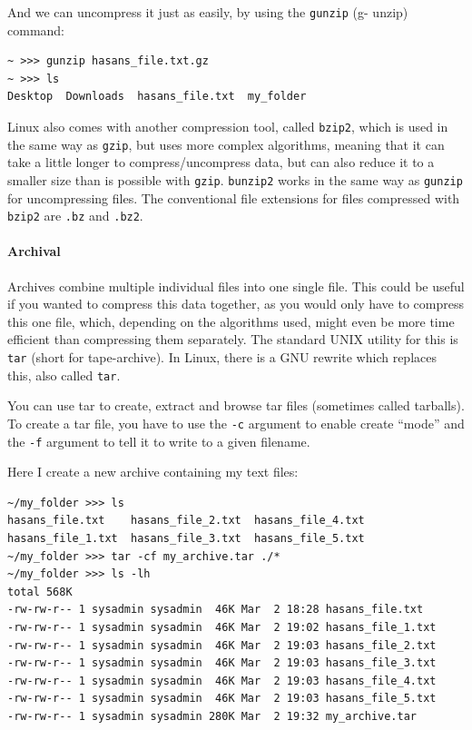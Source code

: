 And we can uncompress it just as easily, by using the \texttt{gunzip} (g- unzip) command:

\begin{verbatim}
~ >>> gunzip hasans_file.txt.gz
~ >>> ls
Desktop  Downloads  hasans_file.txt  my_folder
\end{verbatim}

Linux also comes with another compression tool, called \texttt{bzip2}, which is used in the same way as \texttt{gzip}, but uses more complex algorithms, meaning that it can take a little longer to compress/uncompress data, but can also reduce it to a smaller size than is possible with \texttt{gzip}. \texttt{bunzip2} works in the same way as \texttt{gunzip} for uncompressing files. The conventional file extensions for files compressed with \texttt{bzip2} are \texttt{.bz} and \texttt{.bz2}.

\hypertarget{archival}{%
\paragraph{Archival}\label{archival}}

Archives combine multiple individual files into one single file. This could be useful if you wanted to compress this data together, as you would only have to compress this one file, which, depending on the algorithms used, might even be more time efficient than compressing them separately. The standard UNIX utility for this is \texttt{tar} (short for tape-archive). In Linux, there is a GNU rewrite which replaces this, also called \texttt{tar}.

You can use tar to create, extract and browse tar files (sometimes called tarballs). To create a tar file, you have to use the \texttt{-c} argument to enable create ``mode'' and the \texttt{-f} argument to tell it to write to a given filename.

Here I create a new archive containing my text files:

\begin{verbatim}
~/my_folder >>> ls
hasans_file.txt    hasans_file_2.txt  hasans_file_4.txt
hasans_file_1.txt  hasans_file_3.txt  hasans_file_5.txt
~/my_folder >>> tar -cf my_archive.tar ./*
~/my_folder >>> ls -lh
total 568K
-rw-rw-r-- 1 sysadmin sysadmin  46K Mar  2 18:28 hasans_file.txt
-rw-rw-r-- 1 sysadmin sysadmin  46K Mar  2 19:02 hasans_file_1.txt
-rw-rw-r-- 1 sysadmin sysadmin  46K Mar  2 19:03 hasans_file_2.txt
-rw-rw-r-- 1 sysadmin sysadmin  46K Mar  2 19:03 hasans_file_3.txt
-rw-rw-r-- 1 sysadmin sysadmin  46K Mar  2 19:03 hasans_file_4.txt
-rw-rw-r-- 1 sysadmin sysadmin  46K Mar  2 19:03 hasans_file_5.txt
-rw-rw-r-- 1 sysadmin sysadmin 280K Mar  2 19:32 my_archive.tar
\end{verbatim}

